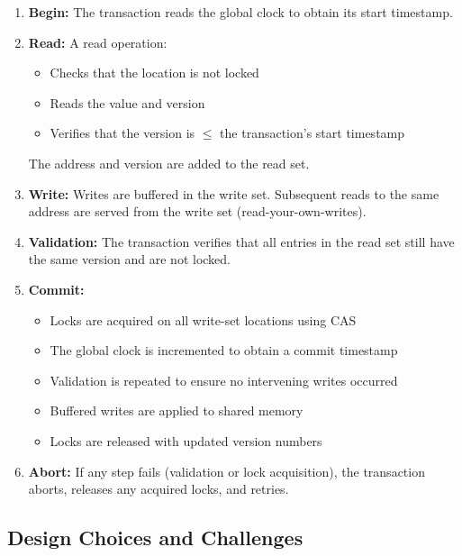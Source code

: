 \documentclass[11pt,a4paper]{article}
\begin{document}
\begin{enumerate}
    \item \textbf{Begin:}  
    The transaction reads the global clock to obtain its start timestamp.

    \item \textbf{Read:}  
    A read operation:
    \begin{itemize}
        \item Checks that the location is not locked
        \item Reads the value and version
        \item Verifies that the version is $\leq$ the transaction's start timestamp
    \end{itemize}
    The address and version are added to the read set.

    \item \textbf{Write:}  
    Writes are buffered in the write set. Subsequent reads to the same address are served from the write set (read-your-own-writes).

    \item \textbf{Validation:}  
    The transaction verifies that all entries in the read set still have the same version and are not locked.

    \item \textbf{Commit:}  
    \begin{itemize}
        \item Locks are acquired on all write-set locations using CAS
        \item The global clock is incremented to obtain a commit timestamp
        \item Validation is repeated to ensure no intervening writes occurred
        \item Buffered writes are applied to shared memory
        \item Locks are released with updated version numbers
    \end{itemize}

    \item \textbf{Abort:}  
    If any step fails (validation or lock acquisition), the transaction aborts, releases any acquired locks, and retries.
\end{enumerate}

\subsection{Design Choices and Challenges}
\end{document}
